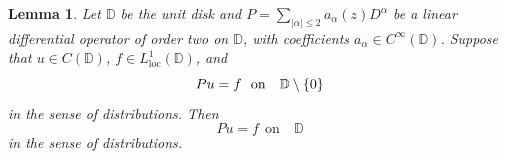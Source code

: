 \documentclass[12pt,twoside]{amsart}
\newcommand{\D}{\ensuremath{\mathbb{D}}}
\newcommand{\C}{\ensuremath{\mathbb{C}}}
\numberwithin{equation}{section}
\newtheorem{lemma}[theorem]{Lemma}
\numberwithin{definition}{section} %
\begin{document}




\begin{lemma}\label{lm:ruojieinonedimension2}
Let $\mathbb D$ be the unit disk and
$
P=\sum_{|\alpha|\le 2}a_\alpha(z)D^\alpha
$
be a linear differential operator of order two on $\mathbb D$, with coefficients $a_\alpha\in C^\infty(\mathbb D)$. Suppose that $u\in C(\mathbb D)$, $f\in L^1_{\mathrm{loc}}(\mathbb D)$, and
\[
Pu=f\ \ \text{on} \quad \mathbb  \D \setminus \{ 0\}
\]
in the sense of distributions. Then
\[
Pu=f \ \ \text{on} \quad \mathbb D
\]
in the sense of distributions.
\end{lemma}
\end{document}
